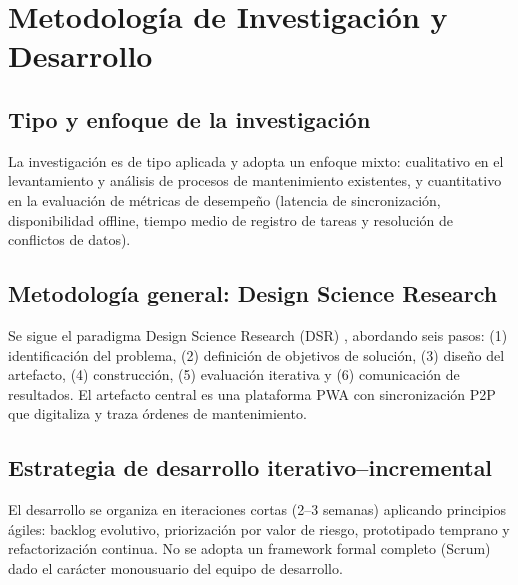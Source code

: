 \documentclass[12pt,a4paper]{report}
\begin{document}
\chapter*{Metodología de Investigación y Desarrollo}
\section*{Tipo y enfoque de la investigación} La investigación es de tipo aplicada y adopta un enfoque mixto: cualitativo en el levantamiento y análisis de procesos de mantenimiento existentes, y cuantitativo en la evaluación de métricas de desempeño (latencia de sincronización, disponibilidad offline, tiempo medio de registro de tareas y resolución de conflictos de datos).

\section*{Metodología general: Design Science Research} 
Se sigue el paradigma Design Science Research (DSR) \cite{hevner2004,peffers2007}, abordando seis pasos: (1) identificación del problema, (2) definición de objetivos de solución, (3) diseño del artefacto, (4) construcción, (5) evaluación iterativa y (6) comunicación de resultados. El artefacto central es una plataforma PWA con sincronización P2P que digitaliza y traza órdenes de mantenimiento.

\section*{Estrategia de desarrollo iterativo–incremental} El desarrollo se organiza en iteraciones cortas (2–3 semanas) aplicando principios ágiles: backlog evolutivo, priorización por valor de riesgo, prototipado temprano y refactorización continua. No se adopta un framework formal completo (Scrum) dado el carácter monousuario del equipo de desarrollo.
\end{document}
